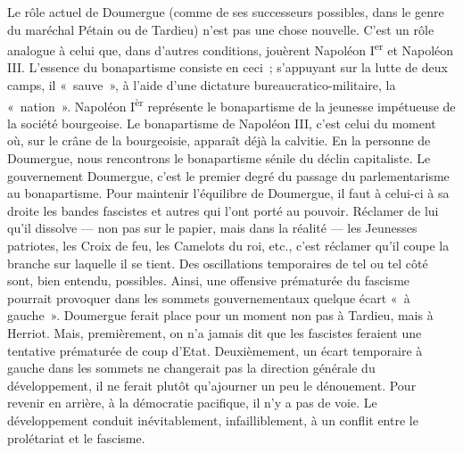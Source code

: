\documentclass[french,twoside]{book} %
\begin{document}
Le rôle actuel de Doumergue (comme de ses successeurs possibles, dans le genre du maréchal Pétain ou de Tardieu) n’est pas une chose nouvelle. C’est un rôle analogue à celui que, dans d’autres conditions, jouèrent Napoléon I\textsuperscript{er} et Napoléon III. L’essence du bonapartisme consiste en ceci ; s’appuyant sur la lutte de deux camps, il « sauve », à l’aide d’une dictature bureaucratico-militaire, la « nation ». Napoléon I\textsuperscript{èr} représente le bonapartisme de la jeunesse impétueuse de la société bourgeoise. Le bonapartisme de Napoléon III, c’est celui du moment où, sur le crâne de la bourgeoisie, apparaît déjà  la calvitie. En la personne de Doumergue, nous rencontrons le bonapartisme sénile du déclin capitaliste. Le gouvernement Doumergue, c’est le premier degré du passage du parlementarisme au bonapartisme. Pour maintenir l’équilibre de Doumergue, il faut à celui-ci à sa droite les bandes fascistes et autres qui l’ont porté au pouvoir. Réclamer de lui qu’il dissolve — non pas sur le papier, mais dans la réalité — les Jeunesses patriotes, les Croix de feu, les Camelots du roi, etc., c’est réclamer qu’il coupe la branche sur laquelle il se tient. Des oscillations temporaires de tel ou tel côté sont, bien entendu, possibles. Ainsi, une offensive prématurée du fascisme pourrait provoquer dans les sommets gouvernementaux quelque écart « à gauche ». Doumergue ferait place pour un moment non pas à Tardieu, mais à Herriot. Mais, premièrement, on n’a jamais dit que les fascistes feraient une tentative prématurée de coup d’Etat. Deuxièmement, un écart temporaire à gauche dans les sommets ne changerait pas la direction générale du développement, il ne ferait plutôt qu’ajourner un peu le dénouement. Pour revenir en arrière, à la démocratie pacifique, il n’y a pas de voie. Le développement conduit inévitablement, infailliblement, à un conflit entre le prolétariat et le fascisme.
\end{document}
